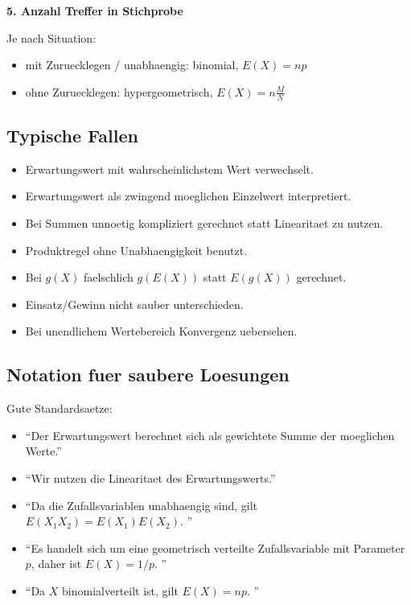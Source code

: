 \documentclass[a4paper,11pt]{article}
\begin{document}
\textbf{5. Anzahl Treffer in Stichprobe}

Je nach Situation:
\begin{itemize}
  \item mit Zuruecklegen / unabhaengig: binomial, $E(X)=np$
  \item ohne Zuruecklegen: hypergeometrisch, $E(X)=n\frac{M}{N}$
\end{itemize}

\subsection{Typische Fallen}
\begin{itemize}
  \item Erwartungswert mit wahrscheinlichstem Wert verwechselt.
  \item Erwartungswert als zwingend moeglichen Einzelwert interpretiert.
  \item Bei Summen unnoetig kompliziert gerechnet statt Linearitaet zu nutzen.
  \item Produktregel ohne Unabhaengigkeit benutzt.
  \item Bei $g(X)$ faelschlich $g(E(X))$ statt $E(g(X))$ gerechnet.
  \item Einsatz/Gewinn nicht sauber unterschieden.
  \item Bei unendlichem Wertebereich Konvergenz uebersehen.
\end{itemize}

\subsection{Notation fuer saubere Loesungen}
Gute Standardsaetze:
\begin{itemize}
  \item ``Der Erwartungswert berechnet sich als gewichtete Summe der moeglichen Werte.''
  \item ``Wir nutzen die Linearitaet des Erwartungswerts.''
  \item ``Da die Zufallsvariablen unabhaengig sind, gilt $E(X_1X_2)=E(X_1)E(X_2)$. ''
  \item ``Es handelt sich um eine geometrisch verteilte Zufallsvariable mit Parameter $p$, daher ist $E(X)=1/p$. ''
  \item ``Da $X$ binomialverteilt ist, gilt $E(X)=np$. ''
\end{itemize}
\end{document}
